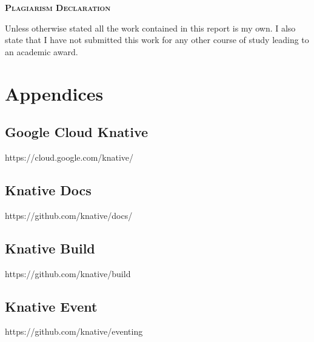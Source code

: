 \documentclass{article}
\begin{document}
\onehalfspacing
\hypersetup{pageanchor=false}

\hypersetup{pageanchor=true}
\clearpage
\begin{center}
\begin{minipage}{\textwidth}
  
  {\scshape\large \textbf{Plagiarism Declaration}\par}
  \vspace{1cm}
  Unless otherwise stated all the work contained in this report is my own.  I also state that I have not submitted this work for any other course of study leading to an academic award.
\end{minipage}
\end{center}
\vfill %
\clearpage

\tableofcontents

\newpage


\newpage


\newpage


\newpage


\newpage


\newpage
\appendix
\section*{Appendices}
\label{appendix:app}
\renewcommand{\thesubsection}{\Alph{subsection}}

\subsection{Google Cloud Knative} 
\label{appendix:gck}
https://cloud.google.com/knative/

\subsection{Knative Docs}
\label{appendix:docs}
https://github.com/knative/docs/

\subsection{Knative Build}
\label{appendix:build}
https://github.com/knative/build

\subsection{Knative Event}
\label{appendix:event}
https://github.com/knative/eventing
\end{document}
